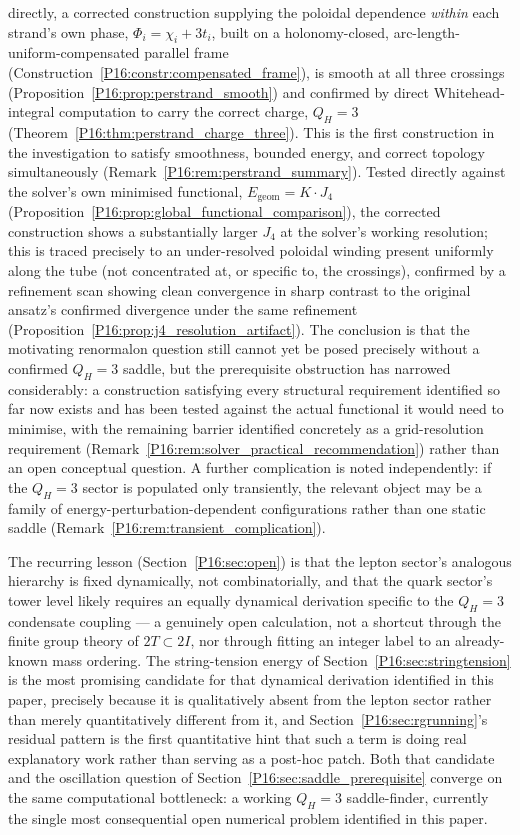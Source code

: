 \documentclass[11pt,a4paper]{article}
\theoremstyle{definition}\newtheorem{definition}[theorem]{Definition}
\theoremstyle{remark}
\theoremstyle{definition}\newtheorem{construction}[theorem]{Construction}
\newcommand{\twoI}{2I}
\newcommand{\twoT}{2T}
\newcommand{\QH}{Q_H}
\begin{document}
directly, a corrected construction supplying the poloidal dependence
\emph{within} each strand's own phase, $\Phi_i=\chi_i+3t_i$, built on
a holonomy-closed, arc-length-uniform-compensated parallel frame
(Construction~\ref{P16:constr:compensated_frame}), is smooth at all three
crossings (Proposition~\ref{P16:prop:perstrand_smooth}) and confirmed by
direct Whitehead-integral computation to carry the correct charge,
$\QH=3$ (Theorem~\ref{P16:thm:perstrand_charge_three}). This is the first
construction in the investigation to satisfy smoothness, bounded
energy, and correct topology simultaneously
(Remark~\ref{P16:rem:perstrand_summary}). Tested directly against the
solver's own minimised functional, $E_{\mathrm{geom}}=K\!\cdot\!J_4$
(Proposition~\ref{P16:prop:global_functional_comparison}), the corrected
construction shows a substantially larger $J_4$ at the solver's
working resolution; this is traced precisely to an under-resolved
poloidal winding present uniformly along the tube (not concentrated
at, or specific to, the crossings), confirmed by a refinement scan
showing clean convergence in sharp contrast to the original ansatz's
confirmed divergence under the same refinement
(Proposition~\ref{P16:prop:j4_resolution_artifact}). The conclusion
is that the motivating renormalon question still cannot yet be posed
precisely without a confirmed $\QH=3$ saddle, but the prerequisite
obstruction has narrowed considerably: a construction satisfying every
structural requirement identified so far now exists and has been
tested against the actual functional it would need to minimise, with
the remaining barrier identified concretely as a grid-resolution
requirement (Remark~\ref{P16:rem:solver_practical_recommendation}) rather
than an open conceptual question. A further
complication is noted independently: if the
$\QH=3$ sector is populated only transiently, the relevant object may
be a family of energy-perturbation-dependent configurations rather
than one static saddle (Remark~\ref{P16:rem:transient_complication}).

The recurring lesson (Section~\ref{P16:sec:open}) is that the lepton
sector's analogous hierarchy is fixed dynamically, not
combinatorially, and that the quark sector's tower level likely
requires an equally dynamical derivation specific to the $\QH=3$
condensate coupling --- a genuinely open calculation, not a
shortcut through the finite group theory of $\twoT\subset\twoI$,
nor through fitting an integer label to an already-known mass
ordering. The string-tension energy of Section~\ref{P16:sec:stringtension}
is the most promising candidate for that dynamical derivation
identified in this paper, precisely because it is qualitatively
absent from the lepton sector rather than merely quantitatively
different from it, and Section~\ref{P16:sec:rgrunning}'s residual pattern
is the first quantitative hint that such a term is doing real
explanatory work rather than serving as a post-hoc patch. Both that
candidate and the oscillation question of
Section~\ref{P16:sec:saddle_prerequisite} converge on the same
computational bottleneck: a working $\QH=3$ saddle-finder, currently
the single most consequential open numerical problem identified in
this paper.
\end{document}
